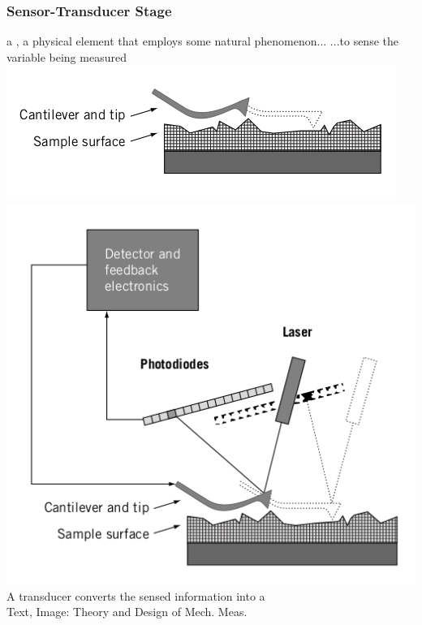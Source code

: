 \documentclass[fleqn]{beamer} %
\begin{document}
\begin{frame}
\frametitle{Sensor-Transducer Stage}
a \hspcuu, a physical element that employs some natural phenomenon... ...to sense the variable being measured
\includegraphics[scale=0.20]{sensor_stage.png}\includegraphics[scale=0.20]{sensor_transducer_stage}\\

A {\GR transducer} converts the sensed information into a \hspcuu \hspcc \hspcuu \\
{\tiny Text, Image: Theory and Design of Mech. Meas.}
\end{frame}
\end{document}
